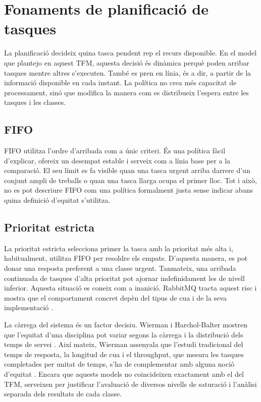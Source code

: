 \section{Fonaments de planificació de tasques}

La planificació decideix quina tasca pendent rep el recurs disponible. En el
model que plantejo en aquest TFM, aquesta decisió és dinàmica perquè poden
arribar tasques mentre altres s'executen. També es pren en línia, és a dir, a
partir de la informació disponible en cada instant. La política no crea més
capacitat de processament, sinó que modifica la manera com es distribueix
l'espera entre les tasques i les classes.

\subsection{FIFO}

FIFO utilitza l'ordre d'arribada com a únic criteri. És una política fàcil
d'explicar, ofereix un desempat estable i serveix com a línia base per a la
comparació. El seu límit es fa visible quan una tasca urgent arriba darrere d'un
conjunt ampli de treballs o quan una tasca llarga ocupa el primer lloc. Tot i
això, no es pot descriure FIFO com una política formalment justa sense indicar
abans quina definició d'equitat s'utilitza.

\subsection{Prioritat estricta}

La prioritat estricta selecciona primer la tasca amb la prioritat més alta i,
habitualment, utilitza FIFO per resoldre els empats. D'aquesta manera, es pot
donar una resposta preferent a una classe urgent. Tanmateix, una arribada
continuada de tasques d'alta prioritat pot ajornar indefinidament les de nivell
inferior. Aquesta situació es coneix com a inanició. RabbitMQ tracta aquest risc
i mostra que el comportament concret depèn del tipus de cua i de la seva
implementació \parencite{rabbitmqPriority}.

La càrrega del sistema és un factor decisiu. Wierman i Harchol-Balter mostren
que l'equitat d'una disciplina pot variar segons la càrrega i la distribució
dels temps de servei \parencite{wierman2003unfairness}. Així mateix, Wierman
assenyala que l'estudi tradicional del temps de resposta, la longitud de cua i
el throughput, que mesura les tasques completades per unitat de temps, s'ha de
complementar amb alguna noció d'equitat
\parencite{wierman2011fairness}. Encara que aquests models no coincideixen
exactament amb el del TFM, serveixen per justificar l'avaluació de diversos
nivells de saturació i l'anàlisi separada dels resultats de cada classe.


